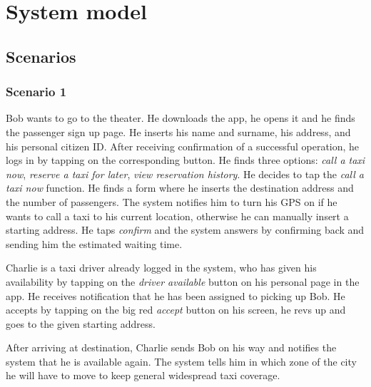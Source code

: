 \chapter{System model}

\section{Scenarios}

\subsection{Scenario 1}
Bob wants to go to the theater. He downloads the \mts{} app, he opens it and he finds the passenger sign up page. He inserts his name and surname, his address, and his personal citizen ID. After receiving confirmation of a successful operation, he logs in by tapping on the corresponding button. He finds three options: \emph{call a taxi now}, \emph{reserve a taxi for later}, \emph{view reservation history}. He decides to tap the \emph{call a taxi now} function. He finds a form where he inserts the destination address and the number of passengers. The system notifies him to turn his GPS on if he wants to call a taxi to his current location, otherwise he can manually insert a starting address. He taps \emph{confirm} and the system answers by confirming back and sending him the estimated waiting time.

Charlie is a taxi driver already logged in the system, who has given his availability by tapping on the \emph{driver available} button on his personal page in the app. He receives notification that he has been assigned to picking up Bob. He accepts by tapping on the big red \emph{accept} button on his screen, he revs up and goes to the given starting address.

After arriving at destination, Charlie sends Bob on his way and notifies the system that he is available again. The system tells him in which zone of the city he will have to move to keep general widespread taxi coverage.

